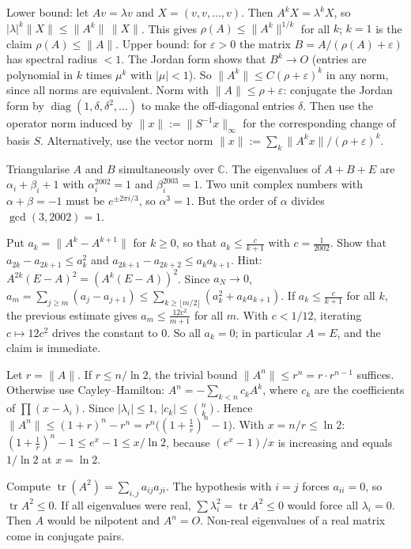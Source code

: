 \documentclass[11pt,a4paper]{article}
\begin{document}

Lower bound: let \(Av=\lambda v\) and \(X=(v,v,\dots,v)\). Then \(A^kX=\lambda^kX\), so \(|\lambda|^k\|X\|\le\|A^k\|\,\|X\|\). This gives \(\rho(A)\le\|A^k\|^{1/k}\) for all \(k\); \(k=1\) is the claim \(\rho(A)\le\|A\|\).
Upper bound: for \(\varepsilon>0\) the matrix \(B=A/(\rho(A)+\varepsilon)\) has spectral radius \(<1\). The Jordan form shows that \(B^k\to O\) (entries are polynomial in \(k\) times \(\mu^k\) with \(|\mu|<1\)). So \(\|A^k\|\le C(\rho+\varepsilon)^k\) in any norm, since all norms are equivalent.
Norm with \(\|A\|\le\rho+\varepsilon\): conjugate the Jordan form by \(\operatorname{diag}(1,\delta,\delta^2,\dots)\) to make the off-diagonal entries \(\delta\). Then use the operator norm induced by \(\|x\|:=\|S^{-1}x\|_\infty\) for the corresponding change of basis \(S\). Alternatively, use the vector norm \(\|x\|:=\sum_k\|A^kx\|/(\rho+\varepsilon)^k\).

Triangularise \(A\) and \(B\) simultaneously over \(\mathbb C\). The eigenvalues of \(A+B+E\) are \(\alpha_i+\beta_i+1\) with \(\alpha_i^{2002}=1\) and \(\beta_i^{2003}=1\).
Two unit complex numbers with \(\alpha+\beta=-1\) must be \(e^{\pm2\pi i/3}\), so \(\alpha^3=1\). But the order of \(\alpha\) divides \(\gcd(3,2002)=1\).

Put \(a_k=\|A^k-A^{k+1}\|\) for \(k\ge0\), so that \(a_k\le\frac{c}{k+1}\) with \(c=\frac1{2002}\). Show that \(a_{2k}-a_{2k+1}\le a_k^2\) and \(a_{2k+1}-a_{2k+2}\le a_ka_{k+1}\). Hint: \(A^{2k}(E-A)^2=(A^k(E-A))^2\).
Since \(a_N\to0\), \(a_m=\sum_{j\ge m}(a_j-a_{j+1})\le\sum_{k\ge\lfloor m/2\rfloor}(a_k^2+a_ka_{k+1})\).
If \(a_k\le\frac{c}{k+1}\) for all \(k\), the previous estimate gives \(a_m\le\frac{12c^2}{m+1}\) for all \(m\). With \(c<1/12\), iterating \(c\mapsto12c^2\) drives the constant to \(0\). So all \(a_k=0\); in particular \(A=E\), and the claim is immediate.

Let \(r=\|A\|\). If \(r\le n/\ln2\), the trivial bound \(\|A^n\|\le r^n=r\cdot r^{n-1}\) suffices.
Otherwise use Cayley--Hamilton: \(A^n=-\sum_{k<n}c_kA^k\), where \(c_k\) are the coefficients of \(\prod(x-\lambda_i)\). Since \(|\lambda_i|\le1\), \(|c_k|\le\binom nk\). Hence \(\|A^n\|\le(1+r)^n-r^n=r^n\bigl((1+\tfrac1r)^n-1\bigr)\).
With \(x=n/r\le\ln 2\): \((1+\frac1r)^n-1\le e^{x}-1\le x/\ln2\), because \((e^x-1)/x\) is increasing and equals \(1/\ln2\) at \(x=\ln2\).

Compute \(\operatorname{tr}(A^2)=\sum_{i,j}a_{ij}a_{ji}\). The hypothesis with \(i=j\) forces \(a_{ii}=0\), so \(\operatorname{tr}A^2\le0\).
If all eigenvalues were real, \(\sum\lambda_i^2=\operatorname{tr}A^2\le0\) would force all \(\lambda_i=0\). Then \(A\) would be nilpotent and \(A^n=O\). Non-real eigenvalues of a real matrix come in conjugate pairs.
\end{document}

